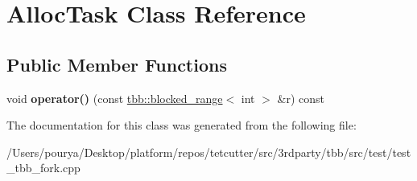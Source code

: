 \hypertarget{classAllocTask}{}\section{Alloc\+Task Class Reference}
\label{classAllocTask}
\subsection*{Public Member Functions}
\begin{DoxyCompactItemize}
\item 
\hypertarget{classAllocTask_ae516410434f6b2cd41704347b70bdfdb}{}void {\bfseries operator()} (const \hyperlink{classtbb_1_1blocked__range}{tbb\+::blocked\+\_\+range}$<$ int $>$ \&r) const \label{classAllocTask_ae516410434f6b2cd41704347b70bdfdb}

\end{DoxyCompactItemize}


The documentation for this class was generated from the following file\+:\begin{DoxyCompactItemize}
\item 
/\+Users/pourya/\+Desktop/platform/repos/tetcutter/src/3rdparty/tbb/src/test/test\+\_\+tbb\+\_\+fork.\+cpp\end{DoxyCompactItemize}
